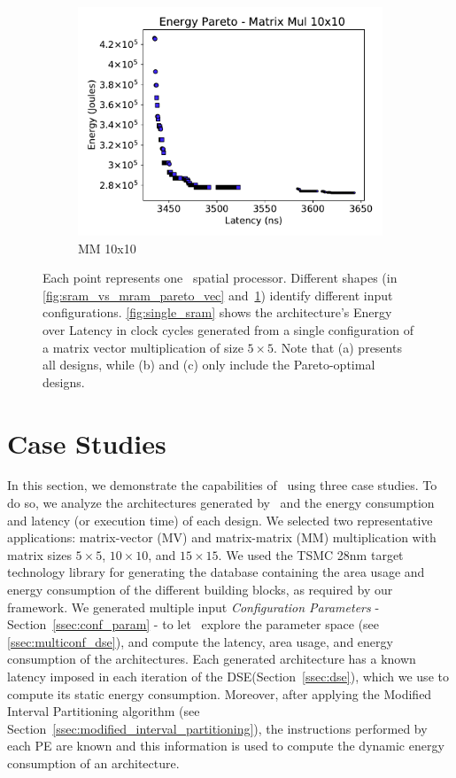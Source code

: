 \begin{figure}[ht]
\begin{subfigure}{.33\textwidth}
  \includegraphics[width=\textwidth]{graphs/EnergyParetoMatrixMul10_v3.pdf}
  \caption{MM 10x10}
  \label{fig:sram_vs_mram_pareto_mul}
\end{subfigure}
    \caption{\small Each point represents one \frameworkname~spatial processor. Different shapes (in \ref{fig:sram_vs_mram_pareto_vec} and~\ref{fig:sram_vs_mram_pareto_mul}) identify different input configurations. \ref{fig:single_sram} shows the architecture's Energy over Latency in clock cycles generated from a single configuration of a matrix vector multiplication of size $5\times5$. Note that (a) presents all designs, while (b) and (c) only include the Pareto-optimal designs.}
\label{fig:case_studies_1}
\end{figure}
\section{Case Studies}
\label{sec:case_studies}
In this section, we demonstrate the capabilities of \frameworkname~using three case studies. To do so, we analyze the architectures generated by \frameworkname~and the energy consumption and latency (or execution time) of each design.
We selected two representative applications: matrix-vector (MV) and matrix-matrix (MM) multiplication with matrix sizes $5\times5$, $10\times10$, and $15\times15$. We used the TSMC 28nm target technology library for generating the database containing the area usage and energy consumption of the different building blocks, as required by our framework.
We generated multiple input \textit{Configuration Parameters} - Section~\ref{ssec:conf_param} - to let \frameworkname~explore the parameter space  (see \ref{ssec:multiconf_dse}), and compute the latency, area usage, and energy consumption of the architectures. Each generated architecture has a known latency imposed in each iteration of the DSE(Section~\ref{ssec:dse}), which we use to compute its static energy consumption. Moreover, after applying the Modified Interval Partitioning algorithm (see Section~\ref{ssec:modified_interval_partitioning}), the instructions performed by each PE are known and this information is used to compute the dynamic energy consumption of an architecture.

